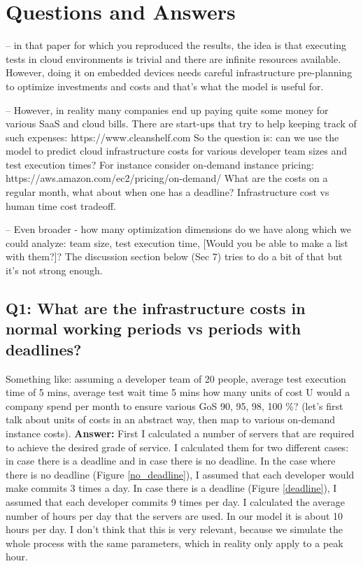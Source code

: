 \documentclass[a4paper]{article}
\begin{document}
\section{Questions and Answers}

-- in that paper for which you reproduced the results, the idea is that executing tests in cloud environments is trivial and there are infinite resources available. However, doing it on embedded devices needs careful infrastructure pre-planning to optimize investments and costs and that's what the model is useful for. 


-- However, in reality many companies end up paying quite some money for various SaaS and cloud bills. There are start-ups that try to help keeping track of such expenses: https://www.cleanshelf.com   So the question is: can we use the model to predict cloud infrastructure costs for various developer team sizes and test execution times? For instance consider on-demand instance pricing: https://aws.amazon.com/ec2/pricing/on-demand/   What are the costs on a regular month, what about when one has a deadline? Infrastructure cost vs human time cost tradeoff. 


-- Even broader - how many optimization dimensions do we have along which we could analyze: team size, test execution time, [Would you be able to make a list with them?]? The discussion section below (Sec 7) tries to do a bit of that but it's not strong enough.

\subsection{Q1: What are the infrastructure costs in normal working periods vs periods with deadlines?}
Something like: assuming a developer team of 20 people, average test execution time of 5 mins, average test wait time 5 mins how many units of cost U would a company spend per month to ensure various GoS 90, 95, 98, 100 \%?  (let's first talk about units of costs in an abstract way, then map to various on-demand instance costs).
\newline \textbf{Answer:}
First I calculated a number of servers that are required to achieve the desired grade of service. I calculated them for two different cases: in case there is a deadline and in case there is no deadline.
In the case where there is no deadline (Figure \ref{no_deadline}), I assumed that each developer would make commits 3 times a day. In case there is a deadline (Figure \ref{deadline}), I assumed that each developer commits 9 times per day.
I calculated the average number of hours per day that the servers are used. In our model it is about 10 hours per day. I don't think that this is very relevant, because we simulate the whole process with the same parameters, which in reality only apply to a peak hour.
\end{document}
